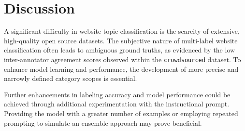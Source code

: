 \section{Discussion}
\label{sec:discussion}

A significant difficulty in website topic classification is the scarcity of extensive, high-quality open source datasets. The subjective nature of multi-label website classification often leads to ambiguous ground truths, as evidenced by the low inter-annotator agreement scores observed within the \texttt{crowdsourced} dataset. To enhance model learning and performance, the development of more precise and narrowly defined category scopes is essential.

Further enhancements in labeling accuracy and model performance could be achieved through additional experimentation with the instructional prompt. 
Providing the model with a greater number of examples or employing repeated prompting to simulate an ensemble approach may prove beneficial.
